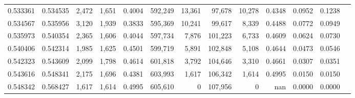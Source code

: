 \begin{tabular}{rrrrrrrrrrrrr}
0.533361 & 0.534535 &  2,472 & 1,651 &                                     0.4004 & 592,249 &  13,361 &  97,678 &  10,278 & 0.4348 & 0.0952 & 0.1238 \\
0.534567 & 0.535956 &  3,120 & 1,939 &                                     0.3833 & 595,369 &  10,241 &  99,617 &   8,339 & 0.4488 & 0.0772 & 0.0949 \\
0.535973 & 0.540354 &  2,365 & 1,606 &                                     0.4044 & 597,734 &   7,876 & 101,223 &   6,733 & 0.4609 & 0.0624 & 0.0730 \\
0.540406 & 0.542314 &  1,985 & 1,625 &                                     0.4501 & 599,719 &   5,891 & 102,848 &   5,108 & 0.4644 & 0.0473 & 0.0546 \\
0.542323 & 0.543609 &  2,099 & 1,798 &                                     0.4614 & 601,818 &   3,792 & 104,646 &   3,310 & 0.4661 & 0.0307 & 0.0351 \\
0.543616 & 0.548341 &  2,175 & 1,696 &                                     0.4381 & 603,993 &   1,617 & 106,342 &   1,614 & 0.4995 & 0.0150 & 0.0150 \\
0.548342 & 0.568427 &  1,617 & 1,614 &                                     0.4995 & 605,610 &       0 & 107,956 &       0 &    nan & 0.0000 & 0.0000 \\
\bottomrule
\end{tabular}
